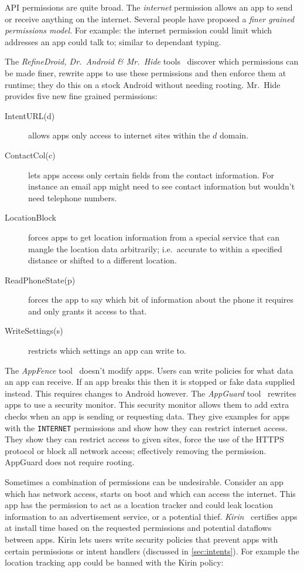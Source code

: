 \documentclass[a4paper,sfsidenotes]{%
  scrartcl%
}
\begin{document}
API permissions are quite broad. 
The \emph{internet} permission allows an app to send or receive anything on the
internet. Several people have proposed a \emph{finer grained permissions model}.
For example: the internet permission could limit which addresses an app could
talk to; similar to dependant typing.

The \emph{RefineDroid, Dr.~Android \& Mr.~Hide} tools~\cite{Jeon:2012ki} discover
which permissions can be made finer, rewrite apps to use these permissions and
then enforce them at runtime; they do this on a stock Android without needing
rooting.  Mr.\ Hide provides five new fine grained permissions:

\begin{description}
  \item[IntentURL(d)] allows apps only access to internet sites within the
    $d$ domain.
  \item[ContactCol(c)] lets apps access only certain fields from the contact
    information.  For instance an email app might need to see contact
    information but wouldn't need telephone numbers.
  \item[LocationBlock] forces apps to get location information from a special
    service that can mangle the location data arbitrarily; i.e.\ accurate to within
    a specified distance or shifted to a different location.
  \item[ReadPhoneState(p)] forces the app to say which bit of information about
    the phone it requires and only grants it access to that.
  \item[WriteSettings(s)] restricts which settings an app can write to.
\end{description}

The \emph{AppFence} tool~\cite{Hornyack:2011wq} doesn't modify apps.  Users can
write policies for what data an app can receive. If an app breaks this then
it is stopped or fake data supplied instead.  This requires changes to Android
however. The \emph{AppGuard} tool~\cite{Backes:2012vm} rewrites
apps to use a security monitor.  This security monitor allows them to add extra
checks when an app is sending or requesting data.  They give examples for apps
with the \texttt{INTERNET} permissions and show how they can restrict internet
access.  They show they can restrict access to given sites, force the use of the
HTTPS protocol or block all network access; effectively removing the permission.
AppGuard does not require rooting.

Sometimes a combination of permissions can be undesirable.  Consider an app
which has network access, starts on boot and which can access the internet.
This app has the permission to act as a location tracker and could leak location
information to an advertisement service, or a potential thief.
\emph{Kirin}~\cite{Enck:2009ko} certifies apps at install time based on
the requested permissions and potential dataflows between apps.
Kirin lets users write security policies that prevent apps with certain
permissions or intent handlers (discussed in \autoref{sec:intents}).  For
example the location tracking app could be banned with the Kirin policy:
\end{document}
